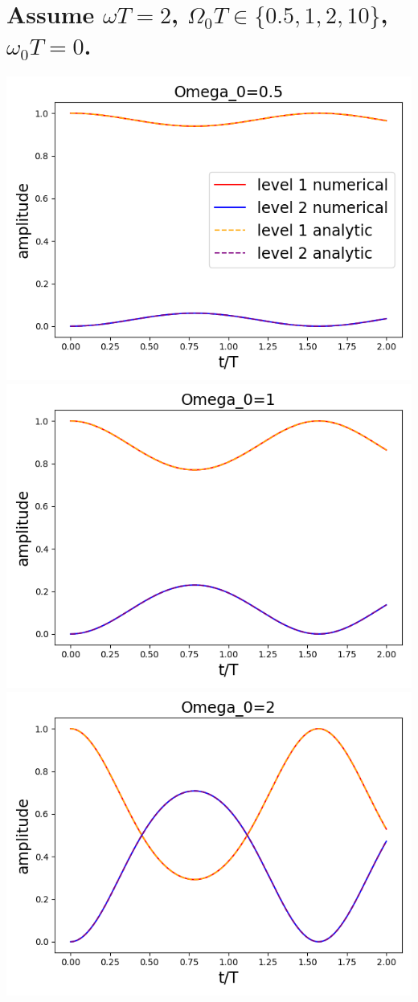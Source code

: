 \documentclass[11pt, oneside]{book}
\theoremstyle{break}
\theoremstyle{break}
\begin{document}
\section{Assume $\omega T = 2$, $\Omega_0 T\in\{0.5, 1,2,10\}$, $\omega_0 T = 0$.}
\begin{center}
\includegraphics[scale=0.39]{542HW1/b0.5}
\includegraphics[scale=0.39]{542HW1/b1}\\
\includegraphics[scale=0.39]{542HW1/b2}

\end{center}
\end{document}
